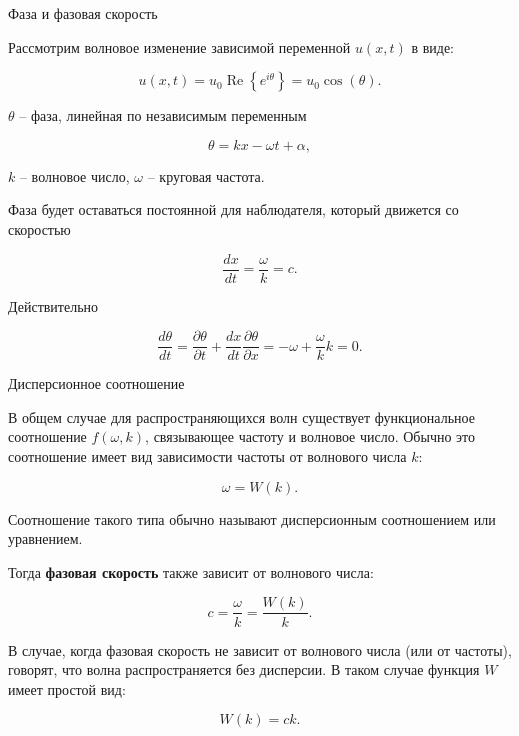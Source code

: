\documentclass[10pt,xcolor=pst,aspectratio=169]{beamer}
\begin{document}
\begin{frame}{Фаза и фазовая скорость}

	\transdissolve[duration=0.1]
	\justifying
	\large

    Рассмотрим волновое изменение зависимой переменной $u \left( x, t \right)$ в виде:

    \[
		u \left( x, t \right) = u_{0} \operatorname{Re} \left\lbrace e^{i \theta} \right\rbrace = u_{0} \cos \left( \theta \right) .
	\]

    $\theta$ -- фаза, линейная по независимым переменным

    \[
        \theta = k x - \omega t + \alpha,
    \]

    $k$ -- волновое число, $\omega$ -- круговая частота.

    Фаза будет оставаться постоянной для наблюдателя, который движется со скоростью

    \[
        \frac{d x}{d t} = \frac{\omega}{k} = c.
    \]

    Действительно

    \[
        \frac{d \theta}{d t} = \frac{\partial \theta}{\partial t} + \frac{d x}{d t} \frac{\partial \theta}{\partial x} = - \omega + \frac{\omega}{k} k = 0.
    \]

\end{frame}

\begin{frame}{Дисперсионное соотношение}

	\transdissolve[duration=0.1]
	\justifying
	\large

    В общем случае для распространяющихся волн существует функциональное соотношение $f \left( \omega, k \right)$, связывающее частоту и волновое число. Обычно это соотношение имеет вид зависимости частоты от волнового числа $k$:

    \[
        \omega = W \left( k \right).
    \]

    Соотношение такого типа обычно называют дисперсионным соотношением или уравнением.

    Тогда \textbf{фазовая скорость} также зависит от волнового числа:

    \[
        c = \frac{\omega}{k} = \frac{W \left( k \right)}{k}.
    \]

    В случае, когда фазовая скорость не зависит от волнового числа (или от частоты), говорят, что волна распространяется без дисперсии. В таком случае функция $W$ имеет простой вид:

    \[
        W \left( k \right) = c k.
    \]

\end{frame}
\end{document}
